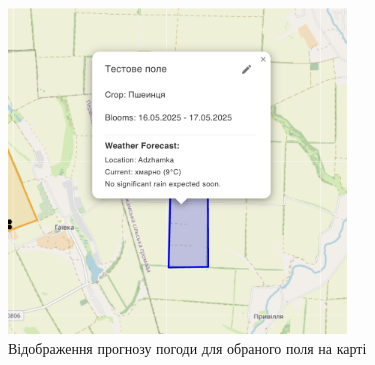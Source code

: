 \begin{figure}[htbp]
    \centering
    \includegraphics[width=0.8\textwidth]{practice_report/images/map_weather_demo.png}
    \caption{Відображення прогнозу погоди для обраного поля на карті}
    \label{fig:task_map_weather_demo}
\end{figure}

